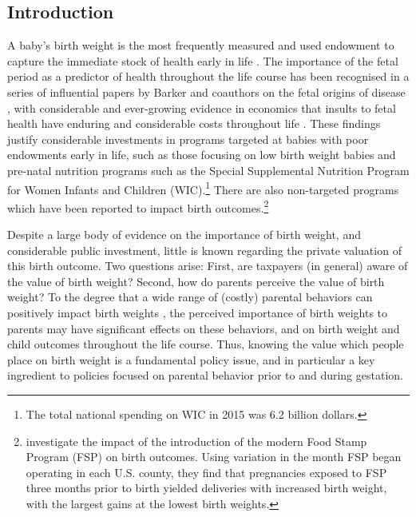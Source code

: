 \documentclass[a4paper, 11pt]{article}
\begin{document}
\begin{spacing}{1.4}
\section{Introduction}
A baby's birth weight is the most frequently measured and used endowment to
capture the immediate stock of health early in life \citep{AlmondCurrie2011,
Almondetal2017}.
The importance of the fetal period as a predictor of health throughout the life
course has been recognised in a series of influential papers by Barker and
coauthors on the fetal origins of disease \citep{Barkeretal1989,Barker1990,
  Barker1995}, with considerable and ever-growing evidence in economics that
insults to fetal
health have enduring and considerable costs throughout life \citep{Almond2006,
  CurrieMoretti2007,Caseetal2005,Almondetal2009,Blacketal2007}.
These findings justify considerable investments in programs targeted at
babies with poor endowments early in life, such as those focusing on low birth
weight babies \citep{Almondetal2005,Bharadwajetal2013} and pre-natal nutrition
programs such as the Special Supplemental Nutrition Program for Women Infants
and Children (WIC).\footnote{The total national spending on WIC in 2015 was 6.2
billion dollars.} There are also non-targeted programs which have been reported to impact birth outcomes.\footnote{\citet{Almondetal2011} investigate the impact of the introduction of the modern Food Stamp Program (FSP) on birth outcomes. Using variation in the month FSP began operating in each U.S. county, they find that pregnancies exposed to FSP three months prior to birth yielded deliveries with increased birth weight, with the largest gains at the lowest birth weights.}

Despite a large body of evidence on the importance of birth weight, and
considerable public investment, little is
known regarding the private valuation of this birth outcome. Two questions  arise: First, are taxpayers (in general) aware of the value of birth weight? Second, how do parents perceive the value of birth weight?
To the degree that a wide range of (costly) parental behaviors can
positively impact birth weights \citep{RosenzweigSchulz1983,
  ChevalierOSullivan2007,SextonHebel1984}, the perceived importance of
birth weights to parents may have significant effects on these behaviors,
and on birth weight and child outcomes throughout the life course. Thus,
knowing the value which people place on birth weight is a fundamental policy issue, and in particular a key ingredient
to policies focused on parental behavior prior to and during gestation.


\end{spacing}
\end{document}

